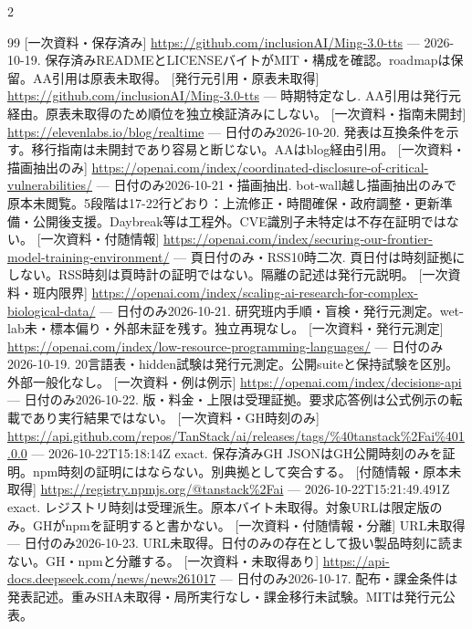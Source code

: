 \documentclass[lualatex,a4paper,10pt]{jlreq}
\begin{document}
\begin{multicols}{2}
{\begin{thebibliography}{99}
 [一次資料・保存済み] \url{https://github.com/inclusionAI/Ming-3.0-tts} --- 2026-10-19. 保存済みREADMEとLICENSEバイトがMIT・構成を確認。roadmapは保留。AA引用は原表未取得。
 [発行元引用・原表未取得] \url{https://github.com/inclusionAI/Ming-3.0-tts} --- 時期特定なし. AA引用は発行元経由。原表未取得のため順位を独立検証済みにしない。
 [一次資料・指南未開封] \url{https://elevenlabs.io/blog/realtime} --- 日付のみ2026-10-20. 発表は互換条件を示す。移行指南は未開封であり容易と断じない。AAはblog経由引用。
 [一次資料・描画抽出のみ] \url{https://openai.com/index/coordinated-disclosure-of-critical-vulnerabilities/} --- 日付のみ2026-10-21・描画抽出. bot-wall越し描画抽出のみで原本未閲覧。5段階は17-22行どおり：上流修正・時間確保・政府調整・更新準備・公開後支援。Daybreak等は工程外。CVE識別子未特定は不存在証明ではない。
 [一次資料・付随情報] \url{https://openai.com/index/securing-our-frontier-model-training-environment/} --- 頁日付のみ・RSS10時二次. 頁日付は時刻証拠にしない。RSS時刻は頁時計の証明ではない。隔離の記述は発行元説明。
 [一次資料・班内限界] \url{https://openai.com/index/scaling-ai-research-for-complex-biological-data/} --- 日付のみ2026-10-21. 研究班内手順・盲検・発行元測定。wet-lab未・標本偏り・外部未証を残す。独立再現なし。
 [一次資料・発行元測定] \url{https://openai.com/index/low-resource-programming-languages/} --- 日付のみ2026-10-19. 20言語表・hidden試験は発行元測定。公開suiteと保持試験を区別。外部一般化なし。
 [一次資料・例は例示] \url{https://openai.com/index/decisions-api} --- 日付のみ2026-10-22. 版・料金・上限は受理証拠。要求応答例は公式例示の転載であり実行結果ではない。
 [一次資料・GH時刻のみ] \url{https://api.github.com/repos/TanStack/ai/releases/tags/%40tanstack%2Fai%401.0.0} --- 2026-10-22T15:18:14Z exact. 保存済みGH JSONはGH公開時刻のみを証明。npm時刻の証明にはならない。別典拠として突合する。
 [付随情報・原本未取得] \url{https://registry.npmjs.org/@tanstack%2Fai} --- 2026-10-22T15:21:49.491Z exact. レジストリ時刻は受理派生。原本バイト未取得。対象URLは限定版のみ。GHがnpmを証明すると書かない。
 [一次資料・付随情報・分離] URL未取得 --- 日付のみ2026-10-23. URL未取得。日付のみの存在として扱い製品時刻に読まない。GH・npmと分離する。
 [一次資料・未取得あり] \url{https://api-docs.deepseek.com/news/news261017} --- 日付のみ2026-10-17. 配布・課金条件は発表記述。重みSHA未取得・局所実行なし・課金移行未試験。MITは発行元公表。

\end{thebibliography}}
\end{multicols}
\end{document}
